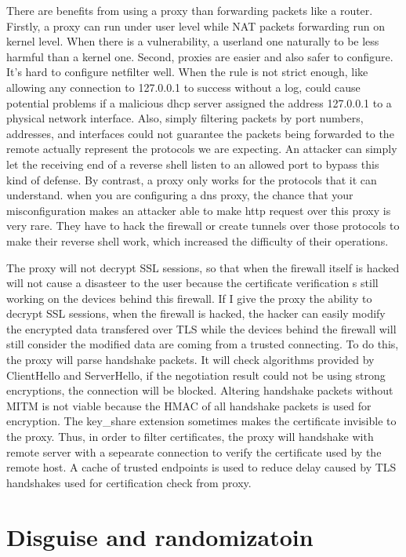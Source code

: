 \documentclass[mscthesis]{usiinfthesis}
\begin{document}
There are benefits from using a proxy than forwarding packets like a router. Firstly, a proxy can run under user level while NAT packets forwarding run on kernel level. When there is a vulnerability, a userland one naturally to be less harmful than a kernel one. Second, proxies are easier and also safer to configure. It's hard to configure netfilter well. When the rule is not strict enough, like allowing any connection to 127.0.0.1 to success without a log, could cause potential problems if a malicious dhcp server assigned the address 127.0.0.1 to a physical network interface. Also, simply filtering packets by port numbers, addresses, and interfaces could not guarantee the packets being forwarded to the remote actually represent the protocols we are expecting. An attacker can simply let the receiving end of a reverse shell listen to an allowed port to bypass this kind of defense. By contrast, a proxy only works for the protocols that it can understand. when you are configuring a dns proxy, the chance that your misconfiguration makes an attacker able to make http request over this proxy is very rare. They have to hack the firewall or create tunnels over those protocols to make their reverse shell work, which increased the difficulty of their operations.\par
The proxy will not decrypt SSL sessions, so that when the firewall itself is hacked will not cause a disasteer to the user because the certificate verification s still working on the devices behind this firewall. If I give the proxy the ability to decrypt SSL sessions, when the firewall is hacked, the hacker can easily modify the encrypted data transfered over TLS while the devices behind the firewall will still consider the modified data are coming from a trusted connecting. To do this, the proxy will parse handshake packets. It will check algorithms provided by ClientHello and ServerHello, if the negotiation result could not be using strong encryptions, the connection will be blocked. Altering handshake packets without MITM is not viable because the HMAC of all handshake packets is used for encryption. The key\_share extension sometimes makes the certificate invisible to the proxy. Thus, in order to filter certificates, the proxy will handshake with remote server with a sepearate connection to verify the certificate used by the remote host. A cache of trusted endpoints is used to reduce delay caused by TLS handshakes used for certification check from proxy.\par

\section{Disguise and randomizatoin}
\end{document}
